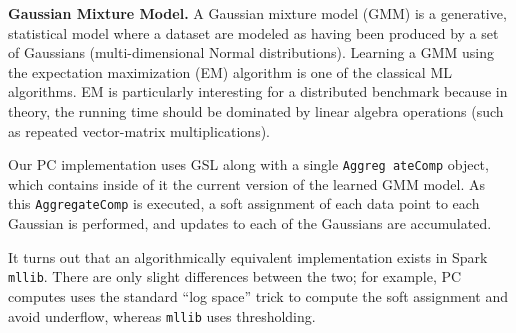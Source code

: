 
\vspace{5pt}
\noindent
\textbf{Gaussian Mixture Model.} A Gaussian mixture model (GMM) is a generative, statistical model where a dataset are modeled
as having been produced by a set of Gaussians (multi-dimensional Normal distributions). Learning a GMM using
the expectation maximization (EM) algorithm is one of the classical ML algorithms.
EM is particularly interesting for a distributed benchmark because in theory, the running time should be dominated
by linear algebra operations (such as repeated vector-matrix multiplications).

Our PC implementation uses GSL \cite{gsl} along with a single
\texttt{Aggreg ateComp} object, which contains inside of it the current
version of the learned GMM model.  As this  \texttt{AggregateComp} is executed, a soft assignment of each
data point to each Gaussian is performed, and updates to each of the Gaussians
are accumulated.  

It turns out that an algorithmically equivalent implementation exists in Spark \texttt{mllib}.
There are only slight differences between the two; for example, PC computes uses the standard ``log space'' trick to
compute the soft assignment and avoid underflow, whereas \texttt{mllib} uses thresholding.  

